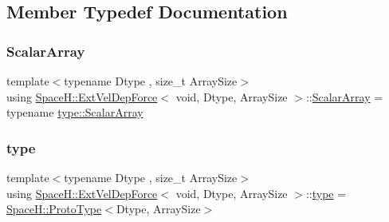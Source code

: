 \subsection{Member Typedef Documentation}
\mbox{\label{struct_space_h_1_1_ext_vel_dep_force_3_01void_00_01_dtype_00_01_array_size_01_4_aff7fedbfa20cab198234cc35a922fa1f}} 
\subsubsection{\texorpdfstring{Scalar\+Array}{ScalarArray}}
{\footnotesize\ttfamily template$<$typename Dtype , size\+\_\+t Array\+Size$>$ \\
using \mbox{\hyperlink{struct_space_h_1_1_ext_vel_dep_force}{Space\+H\+::\+Ext\+Vel\+Dep\+Force}}$<$ void, Dtype, Array\+Size $>$\+::\mbox{\hyperlink{struct_space_h_1_1_ext_vel_dep_force_3_01void_00_01_dtype_00_01_array_size_01_4_aff7fedbfa20cab198234cc35a922fa1f}{Scalar\+Array}} =  typename \mbox{\hyperlink{struct_space_h_1_1_proto_type_a09ef91dc8a37a044c403f5a833044725}{type\+::\+Scalar\+Array}}}

\mbox{\label{struct_space_h_1_1_ext_vel_dep_force_3_01void_00_01_dtype_00_01_array_size_01_4_a6f1a7483c68f9269a6313400c93e774a}} 
\subsubsection{\texorpdfstring{type}{type}}
{\footnotesize\ttfamily template$<$typename Dtype , size\+\_\+t Array\+Size$>$ \\
using \mbox{\hyperlink{struct_space_h_1_1_ext_vel_dep_force}{Space\+H\+::\+Ext\+Vel\+Dep\+Force}}$<$ void, Dtype, Array\+Size $>$\+::\mbox{\hyperlink{struct_space_h_1_1_ext_vel_dep_force_3_01void_00_01_dtype_00_01_array_size_01_4_a6f1a7483c68f9269a6313400c93e774a}{type}} =  \mbox{\hyperlink{struct_space_h_1_1_proto_type}{Space\+H\+::\+Proto\+Type}}$<$Dtype, Array\+Size$>$}

